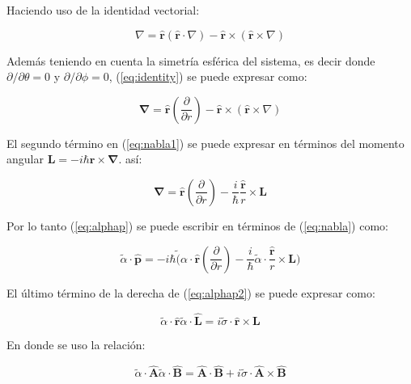 \documentclass[a4paper, 12pt]{article} %
\begin{document}
Haciendo uso de la identidad vectorial: 

\begin{equation}\label{eq:identity}
\nabla = \hat{\mathbf{r}}(\hat{\mathbf{r}}\cdot \nabla) - \hat{\mathbf{r}} \times (\hat{\mathbf{r}} \times \nabla)  
\end{equation}

Adem\'as teniendo en cuenta la simetr\'ia esf\'erica del sistema, es decir donde $\partial/\partial \theta = 0$
y $\partial/\partial \phi = 0$,  (\ref{eq:identity}) se puede expresar como:

\begin{equation}\label{eq:nabla1}
\mathbf\nabla = \hat{\mathbf{r}}(\dfrac{\partial}{\partial r}) - \hat{\mathbf{r}} \times (\hat{\mathbf{r}} \times \nabla)
\end{equation}

El segundo t\'ermino en (\ref{eq:nabla1}) se puede expresar en t\'erminos del momento angular $\mathbf{L} = -i\hbar \mathbf{r} \times \mathbf{\nabla}$.
as\'i:

\begin{equation}\label{eq:nabla}
\mathbf{\nabla} =  \hat{\mathbf{r}}(\dfrac{\partial}{\partial r}) - \dfrac{i}{\hbar}\dfrac{\hat{\mathbf{r}}}{r} \times \mathbf{L}
\end{equation}

Por lo tanto (\ref{eq:alphap}) se puede escribir en t\'erminos de (\ref{eq:nabla}) como:

\begin{equation}\label{eq:alphap2}
\widetilde{\alpha}\cdot \mathbf{\hat{p}} = -i\hbar \widetilde({\alpha}\cdot \hat{\mathbf{r}}(\dfrac{\partial}{\partial r}) - 
\dfrac{i}{\hbar}\widetilde{\alpha}\cdot \dfrac{\hat{\mathbf{r}}}{r} \times \mathbf{L})
\end{equation}

El \'ultimo t\'ermino de la derecha de (\ref{eq:alphap2}) se puede expresar como:

\begin{equation}\label{eq:prop1}
\widetilde{\alpha}\cdot\hat{\mathbf{r}}\widetilde{\alpha} \cdot \hat{\mathbf{L}} = i\widetilde{\sigma}\cdot \hat{\mathbf{r}} \times \mathbf{L}
\end{equation}

En donde se uso la relaci\'on:

\begin{equation}
\widetilde{\alpha}\cdot \hat{\mathbf{A}}\widetilde{\alpha}\cdot \hat{\mathbf{B}}
= \hat{\mathbf{A}} \cdot \hat{\mathbf{B}} +  i\widetilde{\sigma}\cdot \hat{\mathbf{A}}\times \hat{\mathbf{B}}
\end{equation}
\end{document}
